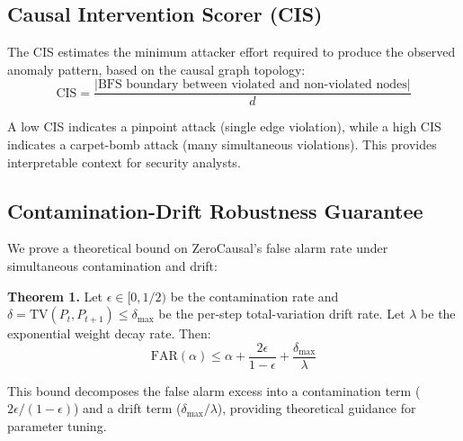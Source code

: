 \subsection{Causal Intervention Scorer (CIS)}

The CIS estimates the minimum attacker effort required to produce the observed anomaly pattern, based on the causal graph topology:
\begin{equation}
\text{CIS} = \frac{|\text{BFS boundary between violated and non-violated nodes}|}{d}
\end{equation}

A low CIS indicates a pinpoint attack (single edge violation), while a high CIS indicates a carpet-bomb attack (many simultaneous violations). This provides interpretable context for security analysts.

\subsection{Contamination-Drift Robustness Guarantee}

We prove a theoretical bound on ZeroCausal's false alarm rate under simultaneous contamination and drift:

\textbf{Theorem 1.} Let $\epsilon \in [0, 1/2)$ be the contamination rate and $\delta = \text{TV}(P_t, P_{t+1}) \leq \delta_{\max}$ be the per-step total-variation drift rate. Let $\lambda$ be the exponential weight decay rate. Then:
\begin{equation}
\text{FAR}(\alpha) \leq \alpha + \frac{2\epsilon}{1-\epsilon} + \frac{\delta_{\max}}{\lambda}
\end{equation}

This bound decomposes the false alarm excess into a contamination term ($2\epsilon/(1-\epsilon)$) and a drift term ($\delta_{\max}/\lambda$), providing theoretical guidance for parameter tuning.
